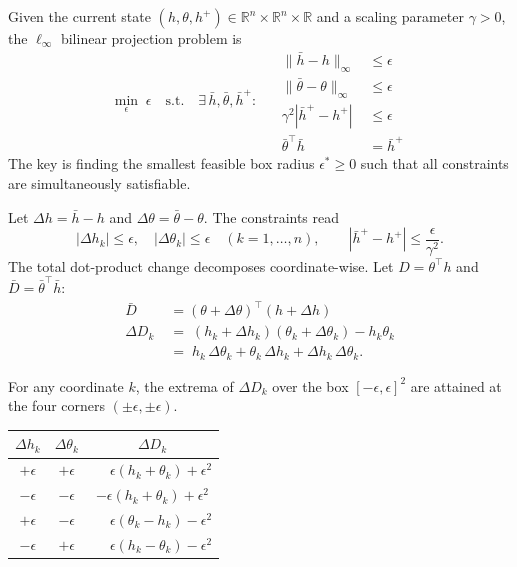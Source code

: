 \documentclass{article}
\theoremstyle{plain}
\theoremstyle{definition}
\theoremstyle{remark}
\begin{document}
Given the current state $(h, \theta, h^{+}) \in \mathbb{R}^n \times \mathbb{R}^n \times
\mathbb{R}$ and a scaling parameter $\gamma > 0$, the $\ell_\infty$ bilinear
projection problem is
\begin{equation}
\label{eq:bilinf-proj-bilinear-layer}
\min_{\epsilon}\; \epsilon \quad 
\text{s.t.} \quad \exists\, \bar h,\bar \theta, \bar h^{+} \colon\; \quad
\begin{aligned}
    \|\bar h-h\|_\infty &\leq \epsilon \\
    \|\bar \theta- \theta\|_\infty &\leq \epsilon \\
    \gamma^2 |\bar h^{+}- h^{+}| \, \, &\leq \epsilon \\
     \bar{\theta}^\top \bar h  &= \bar h^+
\end{aligned}
\end{equation}
The key is finding the smallest feasible box radius $\epsilon^* \geq 0$ such
that all constraints are simultaneously satisfiable.

Let $\Delta h = \bar h - h$ and $\Delta \theta = \bar \theta - \theta$. The
constraints read
\[
  |\Delta h_k| \leq \epsilon,\quad |\Delta \theta_{k}| \leq \epsilon
  \quad (k=1,\dots,n),
  \qquad |\bar h^{+} - h^{+}| \leq \frac{\epsilon}{\gamma^2}.
\]
The total dot-product change decomposes coordinate-wise. Let $D = \theta^\top h$ and $\bar{D} = \bar{\theta}^\top \bar{h}$:
\begin{equation}
\label{eq:bilinf-DeltaP}
\begin{aligned}
 \bar{D} &= (\theta + \Delta \theta)^\top (h + \Delta h) \\
  \Delta D_k 
    \;&=\; (h_k+\Delta h_k)(\theta_{k}+\Delta \theta_{k}) - h_k \theta_{k} \\
    \;&=\; h_k\,\Delta \theta_{k} + \theta_{k}\,\Delta h_k + \Delta h_k\,\Delta \theta_{k}.
\end{aligned}
\end{equation}

For any coordinate $k$, the extrema of $\Delta D_k$ over
the box $[-\epsilon,\epsilon]^2$ are attained at the four corners
$(\pm\epsilon, \pm\epsilon)$.
\begin{center}
\renewcommand{\arraystretch}{1.35}
\begin{tabular}{ccc}
\hline
$\Delta h_k$ & $\Delta \theta_{k}$ & $\Delta D_k$ \\
\hline
$+\epsilon$ & $+\epsilon$ & $\phantom{-}\epsilon(h_k+\theta_{k})+\epsilon^2$ \\
$-\epsilon$ & $-\epsilon$ & $-\epsilon(h_k+\theta_{k})+\epsilon^2$ \\
\hline
$+\epsilon$ & $-\epsilon$ & $\phantom{-}\epsilon(\theta_{k}-h_k)-\epsilon^2$ \\
$-\epsilon$ & $+\epsilon$ & $\phantom{-}\epsilon(h_k-\theta_{k})-\epsilon^2$ \\
\hline
\end{tabular}
\end{center}
\end{document}
